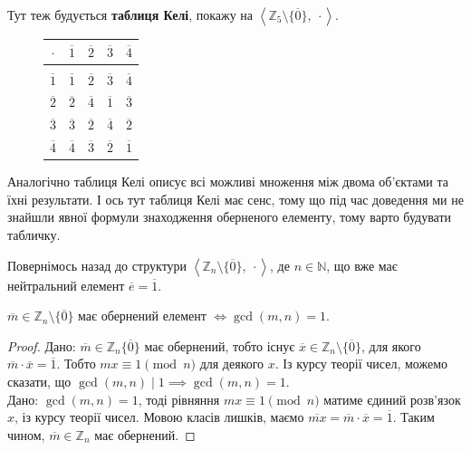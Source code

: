 \documentclass{math_library}
\begin{document}
\begin{example}
Тут теж будується \textbf{таблиця Келі}, покажу на $\left<\mathbb{Z}_5 \setminus \{\overline{0}\},\ \cdot \right>$.
\begin{figure}[H]
\centering
\begin{tabular}{c|cccc}
$\cdot$ & $\overline{1}$ & $\overline{2}$ & $\overline{3}$ & $\overline{4}$ \\
\hline \\ [-9pt]
$\overline{1}$ & $\overline{1}$ & $\overline{2}$ & $\overline{3}$ & $\overline{4}$ \\
$\overline{2}$ & $\overline{2}$ & $\overline{4}$ & $\overline{1}$ & $\overline{3}$ \\
$\overline{3}$ & $\overline{3}$ & $\overline{2}$ & $\overline{4}$ & $\overline{2}$ \\
$\overline{4}$ & $\overline{4}$ & $\overline{3}$ & $\overline{2}$ & $\overline{1}$ \\
\end{tabular}
\end{figure}
Аналогічно таблиця Келі описує всі можливі множення між двома об'єктами та їхні результати. І ось тут таблиця Келі має сенс, тому що під час доведення ми не знайшли явної формули знаходження оберненого елементу, тому варто будувати табличку.
\end{example}

Повернімось назад до структури $\left< \mathbb{Z}_n \setminus \{\overline{0}\},\ \cdot \right>$, де $n \in \mathbb{N}$, що вже має нейтральний елемент $\overline{e} = \overline{1}$.

\begin{lemma}
\label{when_residue_class_is_invertible_in_mulitplicative_class}
$\overline{m} \in \mathbb{Z}_n \setminus \{ \overline{0} \}$ має обернений елемент $\iff \gcd(m,n) = 1$.
\end{lemma}

\begin{proof}
\rightproof Дано: $\overline{m} \in \mathbb{Z}_n \{\overline{0}\}$ має обернений, тобто існує $\overline{x} \in \mathbb{Z}_n \setminus \{\overline{0}\}$, для якого $\overline{m} \cdot \overline{x} = \overline{1}$. Тобто $mx \equiv 1 \pmod n$ для деякого $x$. Із курсу теорії чисел, можемо сказати, що $\gcd(m,n) \mid 1 \implies \gcd(m,n) = 1$.
\bigskip \\
\leftproof Дано: $\gcd(m,n) = 1$, тоді рівняння $mx \equiv 1 \pmod n$ матиме єдиний розв'язок $x$, із курсу теорії чисел. Мовою класів лишків, маємо $\overline{mx} = \overline{m} \cdot \overline{x} = \overline{1}$. Таким чином, $\overline{m} \in \mathbb{Z}_n$ має обернений.
\end{proof}
\end{document}
